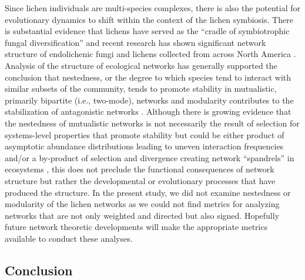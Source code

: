 \documentclass[fleqn,12pt]{olplainarticle}
\begin{document}
Since lichen individuals are multi-species complexes, there is also
the potential for evolutionary dynamics to shift within the context of
the lichen symbiosis. There is substantial evidence that lichens have
served as the ``cradle of symbiotrophic fungal diversification''
\citep{Arnold2009ADiversification} and recent research has shown
significant network structure of endolichenic fungi and lichens
collected from across North America
\citep{Chagnon2016InteractionScale}. Analysis of the structure of
ecological networks has generally supported the conclusion that
nestedness, or the degree to which species tend to interact with
similar subsets of the community, tends to promote stability in
mutualistic, primarily bipartite (i.e., two-mode), networks and
modularity contributes to the stabilization of antagonistic networks
\citep{Elias2013EvolutionaryNetwork,
  Grilli2016ModularityCommunities}. Although there is growing evidence
that the nestedness of mutualistic networks is not necessarily the
result of selection for systems-level properties that promote
stability but could be either product of asymptotic abundance
distributions leading to uneven interaction frequencies
\citep{Staniczenko2013TheNetworks} and/or a by-product of selection
and divergence creating network ``spandrels'' in ecosystems
\citep{Valverde2018TheSpandrel}, this does not preclude the functional
consequences of network structure but rather the developmental or
evolutionary processes that have produced the structure. In the
present study, we did not examine nestedness or modularity of the
lichen networks as we could not find metrics for analyzing networks
that are not only weighted and directed but also signed. Hopefully
future network theoretic developments will make the appropriate
metrics available to conduct these analyses.


\subsection*{Conclusion}
\end{document}
